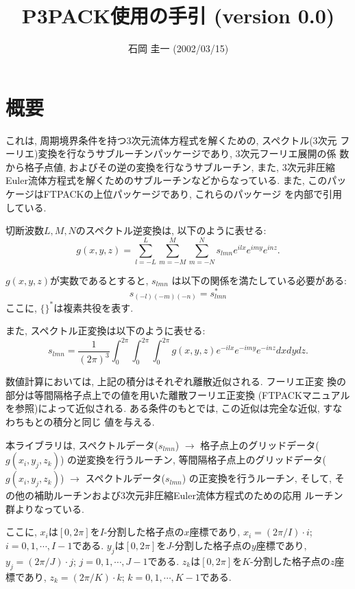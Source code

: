 \documentclass[a4j,fleqn]{jarticle}
\title{P3PACK使用の手引 (version 0.0)}
\author{石岡 圭一  (2002/03/15)}
\date{}
\begin{document}
\maketitle

\section{概要}

これは, 周期境界条件を持つ3次元流体方程式を解くための, スペクトル(3次元
フーリエ)変換を行なうサブルーチンパッケージであり, 3次元フーリエ展開の係
数から格子点値, およびその逆の変換を行なうサブルーチン, また, 
3次元非圧縮Euler流体方程式を解くためのサブルーチンなどからなっている. 
また, このパッケージはFTPACKの上位パッケージであり, これらのパッケージ
を内部で引用している.

切断波数$L,M,N$のスペクトル逆変換は, 以下のように表せる:
\begin{equation}
g(x,y,z)=\sum^L_{l=-L}\sum^M_{m=-M}\sum^N_{m=-N}
s_{lmn}e^{ilx}e^{imy}e^{inz}.
\end{equation}

$g(x,y,z)$が実数であるとすると, $s_{lmn}$
は以下の関係を満たしている必要がある:
\begin{equation}
s_{(-l)(-m)(-n)}=s_{lmn}^{*}
\end{equation}
ここに, $\{ \}^{*}$は複素共役を表す.

また, スペクトル正変換は以下のように表せる:
\begin{equation}
s_{lmn}=\frac1{(2\pi)^3}\int^{2\pi}_0\int^{2\pi}_0\int^{2\pi}_0
g(x,y,z)e^{-ilx}e^{-imy}e^{-inz}dxdydz.
\end{equation}

数値計算においては, 上記の積分はそれぞれ離散近似される. フーリエ正変
換の部分は等間隔格子点上での値を用いた離散フーリエ正変換
(FTPACKマニュアルを参照)によって近似される.
ある条件のもとでは, この近似は完全な近似, すなわちもとの積分と同じ
値を与える.

本ライブラリは, 
スペクトルデータ($s_{lmn}$)
$\to$ 格子点上のグリッドデータ($g(x_i,y_j,z_k)$) 
の逆変換を行うルーチン,
等間隔格子点上のグリッドデータ($g(x_i,y_j,z_k)$)
$\to$ スペクトルデータ($s_{lmn}$) 
の正変換を行うルーチン, 
そして, その他の補助ルーチンおよび3次元非圧縮Euler流体方程式のための応用
ルーチン群よりなっている.

ここに, $x_i$は$[0,2\pi]$を$I$-分割した格子点の$x$座標であり,
$x_i=(2\pi/I)\cdot i$;  $i=0,1,\cdots,I-1$である.
$y_j$は$[0,2\pi]$を$J$-分割した格子点の$y$座標であり,
$y_j=(2\pi/J)\cdot j$;  $j=0,1,\cdots,J-1$である.
$z_k$は$[0,2\pi]$を$K$-分割した格子点の$z$座標であり,
$z_k=(2\pi/K)\cdot k$;  $k=0,1,\cdots,K-1$である.
\end{document}
